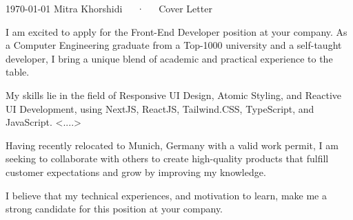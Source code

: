 
\makecvheader[L]

\makecvfooter
  {\today}
  {Mitra Khorshidi~~~·~~~Cover Letter}
  {}

\makelettertitle

\begin{cvletter}

  I am excited to apply for the Front-End Developer position at your company. As a Computer Engineering 
  graduate from a Top-1000 university and a self-taught developer, 
  I bring a unique blend of academic and practical experience to the table.
  
  My skills lie in the field of Responsive UI Design, Atomic Styling, and Reactive UI Development, 
  using NextJS, ReactJS, Tailwind.CSS, TypeScript, and JavaScript.
  <....>
  
  Having recently relocated to Munich, Germany with a valid work permit, 
  I am seeking to collaborate with others to create high-quality products 
  that fulfill customer expectations and grow by improving my knowledge.
  
  I believe that my technical experiences, and motivation to learn, make me a strong candidate 
  for this position at your company.
  

\end{cvletter}
